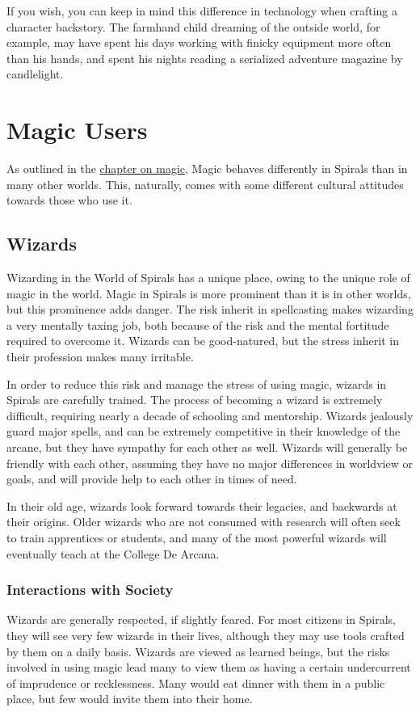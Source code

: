 \begin{multicols}{2}
If you wish, you can keep in mind this difference in technology when crafting a character backstory.
The farmhand child dreaming of the outside world, for example, may have spent his days working with finicky equipment more often than his hands, and spent his nights reading a serialized adventure magazine by candlelight.
\section{Magic Users}
As outlined in the \hyperref[chapter:magic]{chapter on magic}, Magic behaves differently in Spirals than in many other worlds.
This, naturally, comes with some different cultural attitudes towards those who use it.

\subsection{Wizards}
Wizarding in the World of Spirals has a unique place, owing to the unique role of magic in the world.
Magic in Spirals is more prominent than it is in other worlds, but this prominence adds danger.
The risk inherit in spellcasting makes wizarding a very mentally taxing job, both because of the risk and the mental fortitude required to overcome it.
Wizards can be good-natured, but the stress inherit in their profession makes many irritable. 

In order to reduce this risk and manage the stress of using magic, wizards in Spirals are carefully trained.
The process of becoming a wizard is extremely difficult, requiring nearly a decade of schooling and mentorship.
Wizards jealously guard major spells, and can be extremely competitive in their knowledge of the arcane, but they have sympathy for each other as well.
Wizards will generally be friendly with each other, assuming they have no major differences in worldview or goals, and will provide help to each other in times of need.

In their old age, wizards look forward towards their legacies, and backwards at their origins.
Older wizards who are not consumed with research will often seek to train apprentices or students, and many of the most powerful wizards will eventually teach at the College De Arcana.

\subsubsection{Interactions with Society}
Wizards are generally respected, if slightly feared.
For most citizens in Spirals, they will see very few wizards in their lives, although they may use tools crafted by them on a daily basis.
Wizards are viewed as learned beings, but the risks involved in using magic lead many to view them as having a certain undercurrent of imprudence or recklessness.
Many would eat dinner with them in a public place, but few would invite them into their home.


\end{multicols}
